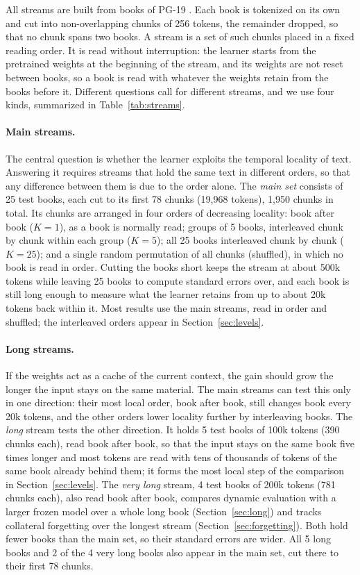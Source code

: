 \documentclass[10pt]{article}
\begin{document}
All streams are built from books of PG-19 \cite{rae2020compressive}.
Each book is tokenized on its own and cut into non-overlapping chunks of 256 tokens, the remainder dropped, so that no chunk spans two books.
A stream is a set of such chunks placed in a fixed reading order.
It is read without interruption: the learner starts from the pretrained weights at the beginning of the stream, and its weights are not reset between books, so a book is read with whatever the weights retain from the books before it. Different questions call for different streams, and we use four kinds, summarized in Table~\ref{tab:streams}.

\paragraph{Main streams.}
The central question is whether the learner exploits the temporal locality of text.
Answering it requires streams that hold the same text in different orders, so that any difference between them is due to the order alone.
The \emph{main set} consists of 25 test books, each cut to its first 78 chunks (19{,}968 tokens), 1{,}950 chunks in total.
Its chunks are arranged in four orders of decreasing locality: book after book ($K=1$), as a book is normally read; groups of 5 books, interleaved chunk by chunk within each group ($K=5$); all 25 books interleaved chunk by chunk ($K=25$); and a single random permutation of all chunks (shuffled), in which no book is read in order.
Cutting the books short keeps the stream at about 500k tokens while leaving 25 books to compute standard errors over, and each book is still long enough to measure what the learner retains from up to about 20k tokens back within it.
Most results use the main streams, read in order and shuffled; the interleaved orders appear in Section~\ref{sec:levels}.

\paragraph{Long streams.}
If the weights act as a cache of the current context, the gain should grow the longer the input stays on the same material.
The main streams can test this only in one direction: their most local order, book after book, still changes book every 20k tokens, and the other orders lower locality further by interleaving books.
The \emph{long} stream tests the other direction.
It holds 5 test books of 100k tokens (390 chunks each), read book after book, so that the input stays on the same book five times longer and most tokens are read with tens of thousands of tokens of the same book already behind them; it forms the most local step of the comparison in Section~\ref{sec:levels}.
The \emph{very long} stream, 4 test books of 200k tokens (781 chunks each), also read book after book, compares dynamic evaluation with a larger frozen model over a whole long book (Section~\ref{sec:long}) and tracks collateral forgetting over the longest stream (Section~\ref{sec:forgetting}).
Both hold fewer books than the main set, so their standard errors are wider.
All 5 long books and 2 of the 4 very long books also appear in the main set, cut there to their first 78 chunks.
\end{document}
